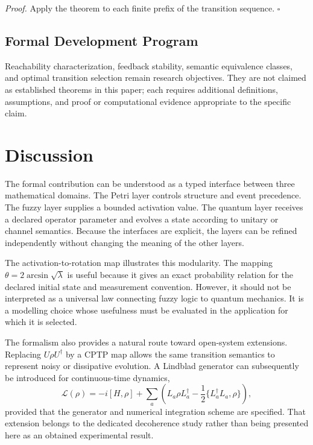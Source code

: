 \documentclass[final,3p,times]{elsarticle}
\begin{document}
\textit{Proof.} Apply the theorem to each finite prefix of the transition sequence. $\square$

\subsection{Formal Development Program}
Reachability characterization, feedback stability, semantic equivalence classes, and optimal transition selection remain research objectives. They are not claimed as established theorems in this paper; each requires additional definitions, assumptions, and proof or computational evidence appropriate to the specific claim.

\section{Discussion}

The formal contribution can be understood as a typed interface between three mathematical domains. The Petri layer controls structure and event precedence. The fuzzy layer supplies a bounded activation value. The quantum layer receives a declared operator parameter and evolves a state according to unitary or channel semantics. Because the interfaces are explicit, the layers can be refined independently without changing the meaning of the other layers.

The activation-to-rotation map illustrates this modularity. The mapping $\theta=2\arcsin\sqrt{\lambda}$ is useful because it gives an exact probability relation for the declared initial state and measurement convention. However, it should not be interpreted as a universal law connecting fuzzy logic to quantum mechanics. It is a modelling choice whose usefulness must be evaluated in the application for which it is selected.

The formalism also provides a natural route toward open-system extensions. Replacing $U\rho U^\dagger$ by a CPTP map allows the same transition semantics to represent noisy or dissipative evolution. A Lindblad generator can subsequently be introduced for continuous-time dynamics,
\begin{equation}
    \mathcal{L}(\rho)
    =-i[H,\rho]
    +\sum_a\left(L_a\rho L_a^\dagger
    -\frac{1}{2}\{L_a^\dagger L_a,\rho\}\right),
\end{equation}
provided that the generator and numerical integration scheme are specified. That extension belongs to the dedicated decoherence study rather than being presented here as an obtained experimental result.
\end{document}
